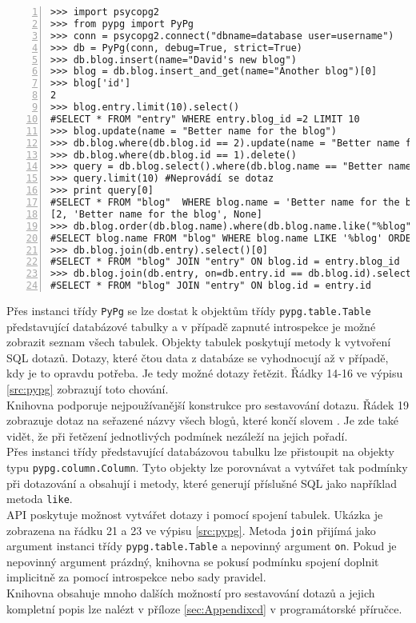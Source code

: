 \documentclass[ing,male,java,dept456]{diploma}						%
\begin{document}
\begin{lstlisting}[style=custompython, numbers=left, label=src:pypg, caption={Základy práce s knihovnou pypg}]
>>> import psycopg2
>>> from pypg import PyPg
>>> conn = psycopg2.connect("dbname=database user=username")
>>> db = PyPg(conn, debug=True, strict=True)
>>> db.blog.insert(name="David's new blog")
>>> blog = db.blog.insert_and_get(name="Another blog")[0]
>>> blog['id']
2
>>> blog.entry.limit(10).select()
#SELECT * FROM "entry" WHERE entry.blog_id =2 LIMIT 10
>>> blog.update(name = "Better name for the blog")
>>> db.blog.where(db.blog.id == 2).update(name = "Better name for the blog")
>>> db.blog.where(db.blog.id == 1).delete()
>>> query = db.blog.select().where(db.blog.name == "Better name for the blog") #Neprovádí se dotaz
>>> query.limit(10) #Neprovádí se dotaz
>>> print query[0]
#SELECT * FROM "blog"  WHERE blog.name = 'Better name for the blog' LIMIT 10
[2, 'Better name for the blog', None]
>>> db.blog.order(db.blog.name).where(db.blog.name.like("%blog")).select(db.blog.name)[0]
#SELECT blog.name FROM "blog" WHERE blog.name LIKE '%blog' ORDER BY blog.name
>>> db.blog.join(db.entry).select()[0]
#SELECT * FROM "blog" JOIN "entry" ON blog.id = entry.blog_id
>>> db.blog.join(db.entry, on=db.entry.id == db.blog.id).select()[0]
#SELECT * FROM "blog" JOIN "entry" ON blog.id = entry.id
\end{lstlisting}

Přes instanci třídy \lstinline[style=inlinepython]|PyPg| se lze dostat k objektům třídy \lstinline[style=inlinepython]|pypg.table.Table| představující databázové tabulky a v případě zapnuté introspekce je možné zobrazit seznam všech tabulek. Objekty tabulek poskytují metody k vytvoření SQL dotazů. Dotazy, které čtou data z databáze se vyhodnocují až v případě, kdy je to opravdu potřeba. Je tedy možné dotazy řetězit. Řádky 14-16 ve výpisu \ref{src:pypg} zobrazují toto chování. \\
Knihovna podporuje nejpoužívanější konstrukce pro sestavování dotazu. Řádek 19 zobrazuje dotaz na seřazené názvy všech blogů, které končí slovem . Je zde také vidět, že při řetězení jednotlivých podmínek nezáleží na jejich pořadí. \\
Přes instanci třídy představující databázovou tabulku lze přistoupit na objekty typu \lstinline[style=inlinepython]|pypg.column.Column|. Tyto objekty lze porovnávat a vytvářet tak podmínky při dotazování a obsahují i metody, které generují příslušné SQL jako například metoda \lstinline[style=inlinepython]|like|. \\
API poskytuje možnost vytvářet dotazy i pomocí spojení tabulek. Ukázka je zobrazena na řádku 21 a 23 ve výpisu \ref{src:pypg}. Metoda \lstinline[style=inlinepython]|join| přijímá jako argument instanci třídy \lstinline[style=inlinepython]|pypg.table.Table| a nepovinný argument \lstinline[style=inlinepython]|on|. Pokud je nepovinný argument prázdný, knihovna se pokusí podmínku spojení doplnit implicitně za pomocí introspekce nebo sady pravidel. \\
Knihovna obsahuje mnoho dalších možností pro sestavování dotazů a jejich kompletní popis lze nalézt v příloze \ref{sec:Appendixcd} v programátorské příručce.
\end{document}
